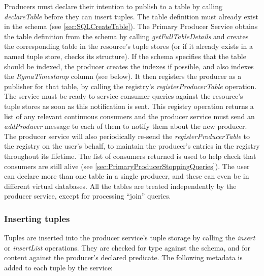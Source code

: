 Producers must declare their intention to publish to a table by calling
\textit{declareTable} before they can insert tuples. The table definition must
already exist in the schema (see \ref{sec:SQLCreateTable}). The Primary
Producer Service obtains the table
definition from the schema by calling \textit{getFullTableDetails} and creates
the corresponding table in the resource's tuple stores (or if it already exists
in a named tuple store, checks its structure). If the
schema specifies that the table should be indexed, the producer creates the
indexes if possible, and also indexes the \textit{RgmaTimestamp} column (see
below).  It then registers the producer as a publisher for
that table, by calling the registry's \textit{registerProducerTable} operation.
The service must be ready to service consumer queries against the resource's
tuple stores as soon as this notification is sent.
This registry operation returns a list of any relevant continuous consumers
and the producer service must send an \textit{addProducer} message to each of
them to notify them about the new producer.
The producer service will also periodically re-send the
\textit{registerProducerTable} to the registry on the user's behalf, to
maintain the producer's entries in the registry throughout its lifetime. The
list of consumers returned is used to help check that consumers are still alive
(see \ref{sec:PrimaryProducerStoppingQueries}).
The user can declare more than one table in a single producer, and these can
even be in different virtual databases. All the tables are treated
independently by the producer service, except for processing ``join'' queries.

\subsubsection{Inserting tuples}\label{sec:PrimaryProducerInserting}

Tuples are inserted into the producer service's tuple storage by calling the
\textit{insert} or \textit{insertList} operations. They are checked for type
against the schema, and for content against the producer's declared predicate.
The following metadata is added to each tuple by the service:

